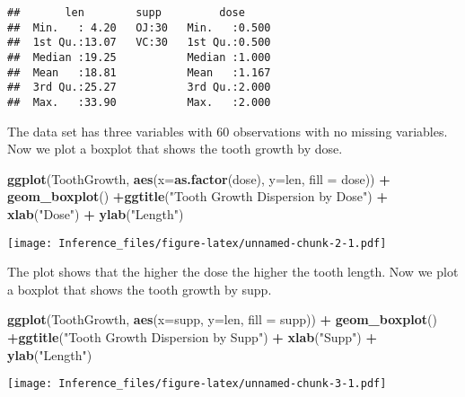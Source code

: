 \documentclass[
]{article}
\newenvironment{Shaded}{\begin{snugshade}}{\end{snugshade}}
\newcommand{\DataTypeTok}[1]{\textcolor[rgb]{0.13,0.29,0.53}{#1}}
\newcommand{\KeywordTok}[1]{\textcolor[rgb]{0.13,0.29,0.53}{\textbf{#1}}}
\newcommand{\NormalTok}[1]{#1}
\newcommand{\OperatorTok}[1]{\textcolor[rgb]{0.81,0.36,0.00}{\textbf{#1}}}
\newcommand{\StringTok}[1]{\textcolor[rgb]{0.31,0.60,0.02}{#1}}
\begin{document}
\begin{verbatim}
##       len        supp         dose      
##  Min.   : 4.20   OJ:30   Min.   :0.500  
##  1st Qu.:13.07   VC:30   1st Qu.:0.500  
##  Median :19.25           Median :1.000  
##  Mean   :18.81           Mean   :1.167  
##  3rd Qu.:25.27           3rd Qu.:2.000  
##  Max.   :33.90           Max.   :2.000
\end{verbatim}

The data set has three variables with 60 observations with no missing
variables. Now we plot a boxplot that shows the tooth growth by dose.

\begin{Shaded}
\begin{Highlighting}[]
\KeywordTok{ggplot}\NormalTok{(ToothGrowth, }\KeywordTok{aes}\NormalTok{(}\DataTypeTok{x=}\KeywordTok{as.factor}\NormalTok{(dose), }\DataTypeTok{y=}\NormalTok{len, }\DataTypeTok{fill =}\NormalTok{ dose)) }\OperatorTok{+}\StringTok{ }\KeywordTok{geom_boxplot}\NormalTok{() }\OperatorTok{+}\KeywordTok{ggtitle}\NormalTok{(}\StringTok{"Tooth Growth Dispersion by Dose"}\NormalTok{) }\OperatorTok{+}\StringTok{ }\KeywordTok{xlab}\NormalTok{(}\StringTok{"Dose"}\NormalTok{) }\OperatorTok{+}\StringTok{ }\KeywordTok{ylab}\NormalTok{(}\StringTok{"Length"}\NormalTok{)}
\end{Highlighting}
\end{Shaded}

\texttt{[image: Inference\_files/figure-latex/unnamed-chunk-2-1.pdf]}

The plot shows that the higher the dose the higher the tooth length. Now
we plot a boxplot that shows the tooth growth by supp.

\begin{Shaded}
\begin{Highlighting}[]
\KeywordTok{ggplot}\NormalTok{(ToothGrowth, }\KeywordTok{aes}\NormalTok{(}\DataTypeTok{x=}\NormalTok{supp, }\DataTypeTok{y=}\NormalTok{len, }\DataTypeTok{fill =}\NormalTok{ supp)) }\OperatorTok{+}\StringTok{ }\KeywordTok{geom_boxplot}\NormalTok{() }\OperatorTok{+}\KeywordTok{ggtitle}\NormalTok{(}\StringTok{"Tooth Growth Dispersion by Supp"}\NormalTok{) }\OperatorTok{+}\StringTok{ }\KeywordTok{xlab}\NormalTok{(}\StringTok{"Supp"}\NormalTok{) }\OperatorTok{+}\StringTok{ }\KeywordTok{ylab}\NormalTok{(}\StringTok{"Length"}\NormalTok{)}
\end{Highlighting}
\end{Shaded}

\texttt{[image: Inference\_files/figure-latex/unnamed-chunk-3-1.pdf]}
\end{document}
